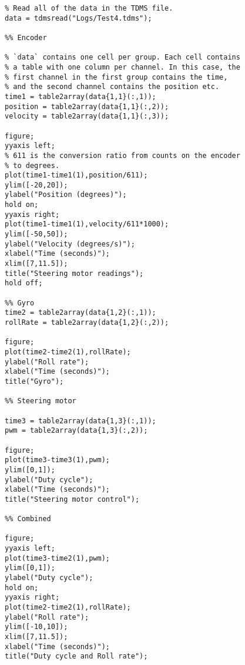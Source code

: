 \begin{lstlisting}
% Read all of the data in the TDMS file.
data = tdmsread("Logs/Test4.tdms");

%% Encoder

% `data` contains one cell per group. Each cell contains
% a table with one column per channel. In this case, the
% first channel in the first group contains the time, 
% and the second channel contains the position etc.
time1 = table2array(data{1,1}(:,1));
position = table2array(data{1,1}(:,2));
velocity = table2array(data{1,1}(:,3));

figure;
yyaxis left;
% 611 is the conversion ratio from counts on the encoder
% to degrees.
plot(time1-time1(1),position/611);
ylim([-20,20]);
ylabel("Position (degrees)");
hold on;
yyaxis right;
plot(time1-time1(1),velocity/611*1000);
ylim([-50,50]);
ylabel("Velocity (degrees/s)");
xlabel("Time (seconds)");
xlim([7,11.5]);
title("Steering motor readings");
hold off;

%% Gyro
time2 = table2array(data{1,2}(:,1));
rollRate = table2array(data{1,2}(:,2));

figure;
plot(time2-time2(1),rollRate);
ylabel("Roll rate");
xlabel("Time (seconds)");
title("Gyro");

%% Steering motor

time3 = table2array(data{1,3}(:,1));
pwm = table2array(data{1,3}(:,2));

figure;
plot(time3-time3(1),pwm);
ylim([0,1]);
ylabel("Duty cycle");
xlabel("Time (seconds)");
title("Steering motor control");

%% Combined

figure;
yyaxis left;
plot(time3-time2(1),pwm);
ylim([0,1]);
ylabel("Duty cycle");
hold on;
yyaxis right;
plot(time2-time2(1),rollRate);
ylabel("Roll rate");
ylim([-10,10]);
xlim([7,11.5]);
xlabel("Time (seconds)");
title("Duty cycle and Roll rate");
\end{lstlisting}